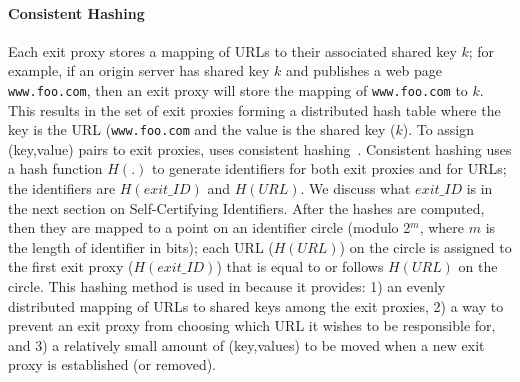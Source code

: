 \paragraph{Consistent Hashing}
Each exit proxy stores a mapping of URLs to their associated shared key $k$; for example, if 
an origin server has shared key $k$ and publishes a web page {\tt www.foo.com}, then an exit 
proxy will store the mapping of {\tt www.foo.com} to $k$.  This results in the set of exit proxies 
forming a distributed hash table where the key is the URL ({\tt www.foo.com} and the value is the 
shared key ($k$).  To assign (key,value) pairs to exit proxies, \system{} uses consistent 
hashing~\cite{karger1997consistent,lewin1998consistent}.  Consistent hashing uses a hash function $H(.)$
to generate identifiers for both exit proxies and for URLs; the identifiers are $H(exit\_ID)$ and $H(URL)$. 
We discuss what $exit\_ID$ is in the next section on Self-Certifying Identifiers.  After the hashes are 
computed, then they are mapped to a point on an identifier circle (modulo 2$^{m}$, where $m$ is the length of 
identifier in bits); each URL ($H(URL)$) on the circle is assigned to the first exit proxy ($H(exit\_ID)$) that 
is equal to or follows $H(URL)$ on the circle.  This hashing method is used in \system{} because it provides: 
1) an evenly distributed mapping of URLs to shared keys among the exit proxies, 2) a way to prevent an exit 
proxy from choosing which URL it wishes to be responsible for, and 3) a relatively small amount 
of (key,values) to be moved when a new exit proxy is established (or removed).  

